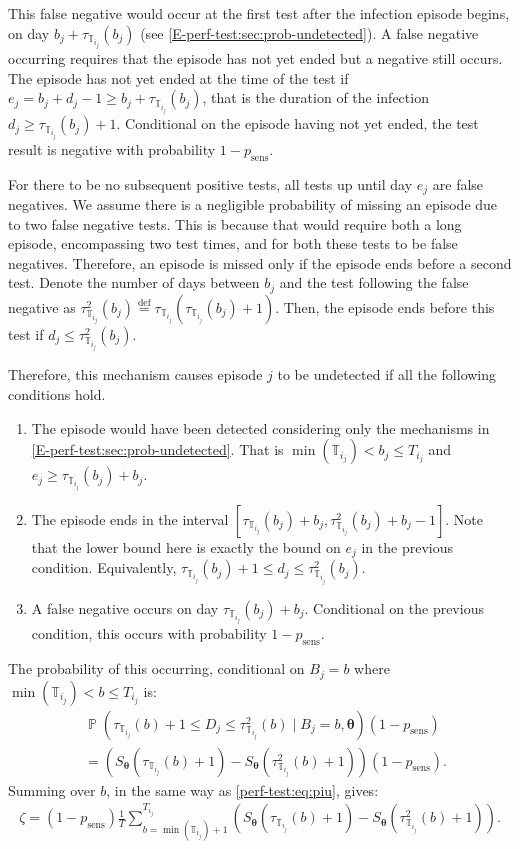 \documentclass[12pt]{article}
\DeclareMathOperator{\prob}{\mathbb{P}}
\renewcommand{\vec}[1]{\bm{#1}}
\newcommand{\psens}{p_\text{sens}}
\newcommand{\sched}{\mathbb{T}}
\begin{document}
This false negative would occur at the first test after the infection episode begins, on day $b_j + \tau_{\sched_{i_j}}(b_j)$ (see \cref{E-perf-test:sec:prob-undetected}).
A false negative occurring requires that the episode has not yet ended but a negative still occurs.
The episode has not yet ended at the time of the test if $e_j = b_j + d_j - 1 \geq b_j + \tau_{\sched_{i_j}}(b_j)$, that is the duration of the infection $d_j \geq \tau_{\sched_{i_j}}(b_j) + 1$.
Conditional on the episode having not yet ended, the test result is negative with probability $1 - \psens$.

For there to be no subsequent positive tests, all tests up until day $e_j$ are false negatives.
We assume there is a negligible probability of missing an episode due to two false negative tests.
This is because that would require both a long episode, encompassing two test times, and for both these tests to be false negatives.
Therefore, an episode is missed only if the episode ends before a second test.
Denote the number of days between $b_j$ and the test following the false negative as $\tau^2_{\sched_{i_j}}(b_j) \stackrel{\text{def}}{=} \tau_{\sched_{i_j}}(\tau_{\sched_{i_j}}(b_j) + 1)$.
Then, the episode ends before this test if $d_j \leq \tau^2_{\sched_{i_j}}(b_j)$.

Therefore, this mechanism causes episode $j$ to be undetected if all the following conditions hold.
\begin{enumerate}
    \item The episode would have been detected considering only the mechanisms in \cref{E-perf-test:sec:prob-undetected}. That is $\min(\sched_{i_j}) < b_j \leq T_{i_j}$ and $e_j \geq \tau_{\sched_{i_j}}(b_j) + b_j$.
    \item The episode ends in the interval $[\tau_{\sched_{i_j}}(b_j) + b_j, \tau^2_{\sched_{i_j}}(b_j) + b_j - 1]$.
      Note that the lower bound here is exactly the bound on $e_j$ in the previous condition.
      Equivalently, $\tau_{\sched_{i_j}}(b_j) + 1 \leq d_j \leq \tau^2_{\sched_{i_j}}(b_j)$.
    \item A false negative occurs on day $\tau_{\sched_{i_j}}(b_j) + b_j$. Conditional on the previous condition, this occurs with probability $1 - \psens$.
\end{enumerate}

The probability of this occurring, conditional on $B_j = b$ where $\min(\sched_{i_j}) < b \leq T_{i_j}$ is:
\begin{align}
&\prob \left(
    \tau_{\sched_{i_j}}(b) + 1 \leq D_j \leq \tau^2_{\sched_{i_j}}(b)
    \mid B_j = b, \vec{\theta} \right) (1 - \psens) \\
&= \left( S_{\vec{\theta}}(\tau_{\sched_{i_j}}(b) + 1) - S_{\vec{\theta}}(\tau^2_{\sched_{i_j}}(b) + 1) \right) (1 - \psens).
\end{align}
Summing over $b$, in the same way as \cref{perf-test:eq:piu}, gives:
\begin{align}
\zeta = (1 - p_\text{sens})\frac{1}{T} \sum_{b=\min(\sched_{i_j}) + 1}^{T_{i_j}} \left( S_{\vec{\theta}}(\tau_{\sched_{i_j}}(b) + 1) - S_{\vec{\theta}}(\tau^2_{\sched_{i_j}}(b) + 1) \right).
\label{imperf-test:eq:zeta}
\end{align}
\end{document}
